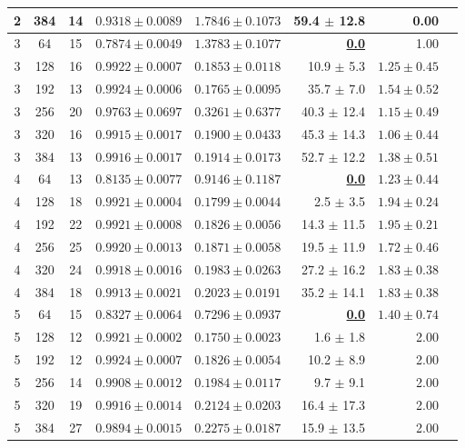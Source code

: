 \begin{table}[htbp]
\begin{tabular}{cccrrrrr}
  2 & 384 & 14 & $0.9318 \pm 0.0089$ & $\mathbf{1.7846 \pm 0.1073}$ & 59.4 $\pm$ 12.8 & 0.00 \\
\midrule
  3 & 64 & 15 & $0.7874 \pm 0.0049$ & $1.3783 \pm 0.1077$ & \underline{\textbf{0.0}} & 1.00 \\
  3 & 128 & 16 & $0.9922 \pm 0.0007$ & $0.1853 \pm 0.0118$ & 10.9 $\pm$ 5.3 & $1.25 \pm 0.45$ \\
  3 & 192 & 13 & \underline{$\mathbf{0.9924 \pm 0.0006}$} & $\mathbf{0.1765 \pm 0.0095}$ & 35.7 $\pm$ 7.0 & $1.54 \pm 0.52$ \\
  3 & 256 & 20 & $0.9763 \pm 0.0697$ & $0.3261 \pm 0.6377$ & 40.3 $\pm$ 12.4 & $1.15 \pm 0.49$ \\
  3 & 320 & 16 & $0.9915 \pm 0.0017$ & $0.1900 \pm 0.0433$ & 45.3 $\pm$ 14.3 & $1.06 \pm 0.44$ \\
  3 & 384 & 13 & $0.9916 \pm 0.0017$ & $0.1914 \pm 0.0173$ & 52.7 $\pm$ 12.2 & $1.38 \pm 0.51$ \\
\midrule
  4 & 64 & 13 & $0.8135 \pm 0.0077$ & $0.9146 \pm 0.1187$ & \underline{\textbf{0.0}} & $1.23 \pm 0.44$ \\
  4 & 128 & 18 & $0.9921 \pm 0.0004$ & $\mathbf{0.1799 \pm 0.0044}$ & 2.5 $\pm$ 3.5 & $1.94 \pm 0.24$ \\
  4 & 192 & 22 & $\mathbf{0.9921 \pm 0.0008}$ & $0.1826 \pm 0.0056$ & 14.3 $\pm$ 11.5 & $1.95 \pm 0.21$ \\
  4 & 256 & 25 & $0.9920 \pm 0.0013$ & $0.1871 \pm 0.0058$ & 19.5 $\pm$ 11.9 & $1.72 \pm 0.46$ \\
  4 & 320 & 24 & $0.9918 \pm 0.0016$ & $0.1983 \pm 0.0263$ & 27.2 $\pm$ 16.2 & $1.83 \pm 0.38$ \\
  4 & 384 & 18 & $0.9913 \pm 0.0021$ & $0.2023 \pm 0.0191$ & 35.2 $\pm$ 14.1 & $1.83 \pm 0.38$ \\
\midrule
  5 & 64 & 15 & $0.8327 \pm 0.0064$ & $0.7296 \pm 0.0937$ & \underline{\textbf{0.0}} & $1.40 \pm 0.74$ \\
  5 & 128 & 12 & $0.9921 \pm 0.0002$ & \underline{$\mathbf{0.1750 \pm 0.0023}$} & 1.6 $\pm$ 1.8 & 2.00 \\
  5 & 192 & 12 & $\mathbf{0.9924 \pm 0.0007}$ & $0.1826 \pm 0.0054$ & 10.2 $\pm$ 8.9 & 2.00 \\
  5 & 256 & 14 & $0.9908 \pm 0.0012$ & $0.1984 \pm 0.0117$ & 9.7 $\pm$ 9.1 & 2.00 \\
  5 & 320 & 19 & $0.9916 \pm 0.0014$ & $0.2124 \pm 0.0203$ & 16.4 $\pm$ 17.3 & 2.00 \\
  5 & 384 & 27 & $0.9894 \pm 0.0015$ & $0.2275 \pm 0.0187$ & 15.9 $\pm$ 13.5 & 2.00 \\
\bottomrule
\end{tabular}
\end{table}
